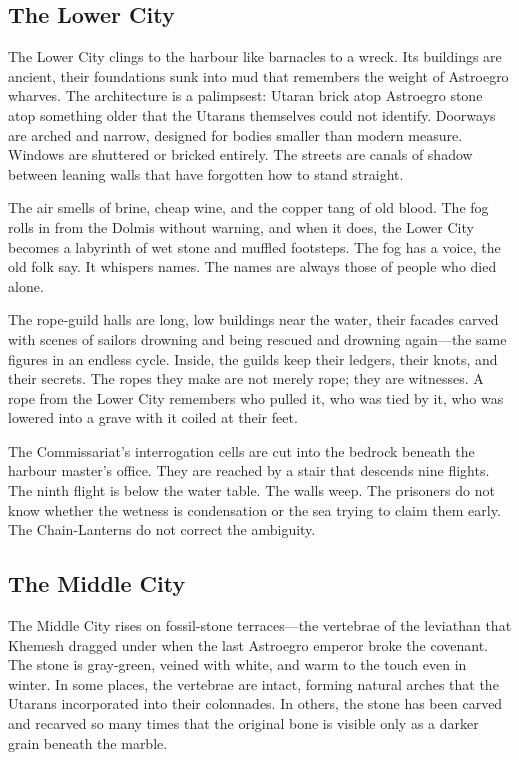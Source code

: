 \documentclass[10pt,twocolumn]{book}
\begin{document}
\subsection{The Lower City}

The Lower City clings to the harbour like barnacles to a wreck. Its buildings are ancient, their foundations sunk into mud that remembers the weight of Astroegro wharves. The architecture is a palimpsest: Utaran brick atop Astroegro stone atop something older that the Utarans themselves could not identify. Doorways are arched and narrow, designed for bodies smaller than modern measure. Windows are shuttered or bricked entirely. The streets are canals of shadow between leaning walls that have forgotten how to stand straight.

The air smells of brine, cheap wine, and the copper tang of old blood. The fog rolls in from the Dolmis without warning, and when it does, the Lower City becomes a labyrinth of wet stone and muffled footsteps. The fog has a voice, the old folk say. It whispers names. The names are always those of people who died alone.

The rope-guild halls are long, low buildings near the water, their facades carved with scenes of sailors drowning and being rescued and drowning again---the same figures in an endless cycle. Inside, the guilds keep their ledgers, their knots, and their secrets. The ropes they make are not merely rope; they are witnesses. A rope from the Lower City remembers who pulled it, who was tied by it, who was lowered into a grave with it coiled at their feet.

The Commissariat's interrogation cells are cut into the bedrock beneath the harbour master's office. They are reached by a stair that descends nine flights. The ninth flight is below the water table. The walls weep. The prisoners do not know whether the wetness is condensation or the sea trying to claim them early. The Chain-Lanterns do not correct the ambiguity.

\subsection{The Middle City}

The Middle City rises on fossil-stone terraces---the vertebrae of the leviathan that Khemesh dragged under when the last Astroegro emperor broke the covenant. The stone is gray-green, veined with white, and warm to the touch even in winter. In some places, the vertebrae are intact, forming natural arches that the Utarans incorporated into their colonnades. In others, the stone has been carved and recarved so many times that the original bone is visible only as a darker grain beneath the marble.
\end{document}
